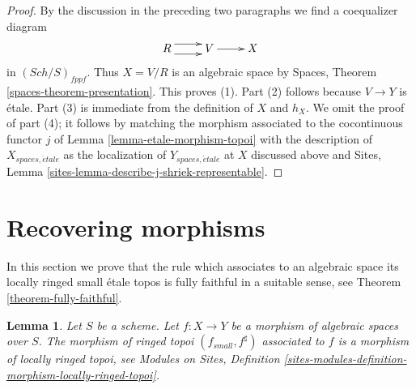 \documentclass{stacks-project}
\theoremstyle{plain}
\newtheorem{lemma}[subsection]{Lemma}
\theoremstyle{definition}
\theoremstyle{remark}
\numberwithin{equation}{subsection}
\def\Sch{\mathit{Sch}}
\def\etale{{\acute{e}tale}}
\begin{document}
\begin{proof}
\medskip\noindent
By the discussion in the preceding two paragraphs we find a
coequalizer diagram
$$
\xymatrix{
R \ar@<1ex>[r] \ar@<-1ex>[r] &
V \ar[r] &
X
}
$$
in $(\Sch/S)_{fppf}$. Thus $X = V/R$ is an algebraic space by
Spaces, Theorem \ref{spaces-theorem-presentation}. This proves (1).
Part (2) follows because $V \to Y$ is \'etale. Part (3) is immediate
from the definition of $X$ and $h_X$. We omit the proof of part (4);
it follows by matching the morphism associated to the cocontinuous
functor $j$ of Lemma \ref{lemma-etale-morphism-topoi}
with the description of $X_{spaces, \etale}$ as the localization
of $Y_{spaces, \etale}$ at $X$ discussed above and
Sites, Lemma \ref{sites-lemma-describe-j-shriek-representable}.
\end{proof}







\section{Recovering morphisms}
\label{section-morphisms}

\noindent
In this section we prove that the rule which associates to an algebraic space
its locally ringed small \'etale topos is fully faithful in a suitable
sense, see
Theorem \ref{theorem-fully-faithful}.

\begin{lemma}
\label{lemma-morphism-locally-ringed}
Let $S$ be a scheme.
Let $f : X \to Y$ be a morphism of algebraic spaces over $S$.
The morphism of ringed topoi $(f_{small}, f^\sharp)$
associated to $f$ is a morphism of locally ringed topoi, see
Modules on Sites,
Definition \ref{sites-modules-definition-morphism-locally-ringed-topoi}.
\end{lemma}
\end{document}
